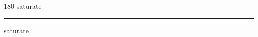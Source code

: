 
\begin{frame}
\begin{center}
\begin{turn}{180}
{\fontsize{2.5cm}{1em}\selectfont saturate}
\end{turn}
\vspace{1em}\par  
\hrule
\vspace{1em}\par  
{\fontsize{2.5cm}{1em}\selectfont saturate}
\end{center}
\end{frame}
